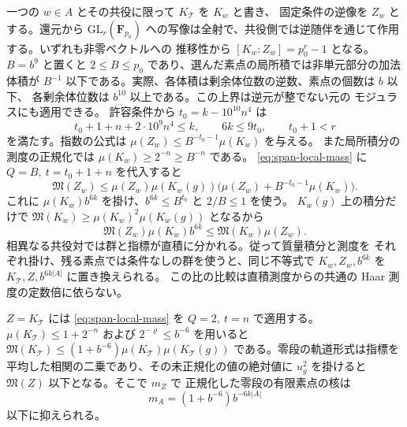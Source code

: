 一つの \(w\in A\) とその共役に限って \(K_{\mathcal T}\) を \(K_w\) と書き、
固定条件の逆像を \(Z_w\) とする。還元から \(\mathrm{GL}_r(\mathbf F_{p_0})\)
への写像は全射で、共役側では逆随伴を通じて作用する。いずれも非零ベクトルへの
推移性から \([K_w:Z_w]=p_0^r-1\) となる。\(B=b^9\) と置くと
\(2\le B\le p_0\) であり、選んだ素点の局所積では非単元部分の加法体積が
\(B^{-1}\) 以下である。実際、各体積は剰余体位数の逆数、素点の個数は \(b\) 以下、
各剰余体位数は \(b^{10}\) 以上である。この上界は逆元が整でない元の
モジュラスにも適用できる。
許容条件から \(t_0=k-10^{10}n^4\) は
\[
 t_0+1+n+2\cdot10^9n^4\le k,\qquad
 6k\le9t_0,\qquad t_0+1<r
\]
を満たす。指数の公式は \(\mu(Z_w)\le B^{-t_0-1}\mu(K_w)\) を与える。
また局所積分の測度の正規化では \(\mu(K_w)\ge2^{-n}\ge B^{-n}\) である。
\eqref{eq:span-local-mass} に \(Q=B,\ t=t_0+1+n\) を代入すると
\[
 \mathfrak M(Z_w)\le
 \mu(Z_w)\mu(K_w(g))
       \bigl(\mu(Z_w)+B^{-t_0-1}\mu(K_w)\bigr).
\]
これに \(\mu(K_w)b^{6k}\) を掛け、\(b^{6k}\le B^{t_0}\) と \(2/B\le1\) を使う。
\(K_w(g)\) 上の積分だけで
\(\mathfrak M(K_w)\ge\mu(K_w)^2\mu(K_w(g))\) となるから
\[
 \mathfrak M(Z_w)\mu(K_w)b^{6k}
 \le\mathfrak M(K_w)\mu(Z_w).
\]
相異なる共役対では群と指標が直積に分かれる。従って質量積分と測度を
それぞれ掛け、残る素点では条件なしの群を使うと、同じ不等式で
\(K_w,Z_w,b^{6k}\) を \(K_{\mathcal T},Z,b^{6k|A|}\) に置き換えられる。
この比の比較は直積測度からの共通の Haar 測度の定数倍に依らない。

\(Z=K_{\mathcal T}\) には \eqref{eq:span-local-mass} を \(Q=2,\ t=n\) で適用する。
\(\mu(K_{\mathcal T})\le1+2^{-n}\) および \(2^{-\varrho}\le b^{-6}\) を用いると
\(\mathfrak M(K_{\mathcal T})\le(1+b^{-6})\mu(K_{\mathcal T})\mu(K_{\mathcal T}(g))\)
である。零段の軌道形式は指標を平均した相関の二乗であり、その未正規化の値の絶対値に
\(u_g^2\) を掛けると \(\mathfrak M(Z)\) 以下となる。そこで \(m_Z\) で
正規化した零段の有限素点の核は
\begin{equation}\label{eq:span-local-zero}
 m_A=(1+b^{-6})b^{-6k|A|}
\end{equation}
以下に抑えられる。

